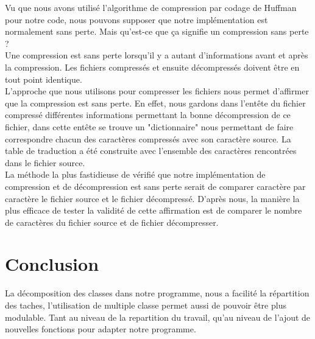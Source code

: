 \documentclass[10pt,a4paper]{article}
\begin{document}
Vu que nous avons utilisé l'algorithme de compression par codage de Huffman pour notre code, nous pouvons supposer que notre implémentation est normalement sans perte. Mais qu'est-ce que ça signifie un compression sans perte ? \\ Une compression est sans perte lorsqu'il y a autant d'informations avant et après la compression. Les fichiers compressés et ensuite décompressés doivent être en tout point identique.\\
L'approche que nous utilisons pour compresser les fichiers nous permet d'affirmer que la compression est sans perte. En effet, nous gardons dans l'entête du fichier compressé différentes informations permettant la bonne décompression de ce fichier, dans cette entête se trouve un "dictionnaire" nous permettant de faire correspondre chacun des caractères compressés avec son caractère source. La table de traduction a été construite avec l'ensemble des caractères rencontrées dans le fichier source. \\La méthode la plus fastidieuse de vérifié que notre implémentation de compression et de décompression est sans perte serait de comparer caractère par caractère le fichier source et le fichier décompressé. D'après nous, la manière la plus efficace de tester la validité de cette affirmation est de comparer le nombre de caractères du fichier source et de fichier décompresser.

\section*{Conclusion}
La décomposition des classes dans notre programme, nous a facilité la répartition des taches, l'utilisation de multiple classe permet aussi de pouvoir être plus modulable. Tant au niveau de la repartition du travail, qu'au niveau de l'ajout de nouvelles fonctions pour adapter notre programme.\\ 
\end{document}
